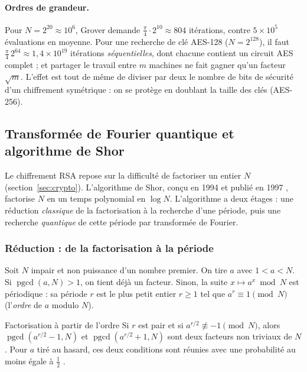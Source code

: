 \paragraph{Ordres de grandeur.} Pour $N=2^{20}\approx10^6$, Grover demande
$\frac\pi4\cdot2^{10}\approx804$ itérations, contre $5\times10^5$ évaluations en moyenne. Pour une
recherche de clé AES-128 ($N=2^{128}$), il faut $\frac\pi4\,2^{64}\approx1{,}4\times10^{19}$
itérations \emph{séquentielles}, dont chacune contient un circuit AES complet ; et partager le travail
entre $m$ machines ne fait gagner qu'un facteur $\sqrt m$. L'effet est tout de même de diviser par deux le
nombre de bits de sécurité d'un chiffrement symétrique : on se protège en doublant la taille des
clés (AES-256).

\subsection{Transformée de Fourier quantique et algorithme de Shor}\label{sec:shor}

Le chiffrement RSA repose sur la difficulté de factoriser un entier $N$ (section~\ref{sec:crypto}).
L'algorithme de Shor, conçu en 1994 et publié en 1997 \parencite{shor1997}, factorise $N$ en un temps polynomial en $\log N$.
L'algorithme a deux étages : une réduction \emph{classique} de la factorisation à la recherche d'une
période, puis une recherche \emph{quantique} de cette période par transformée de Fourier.

\subsubsection{Réduction : de la factorisation à la période}

Soit $N$ impair et non puissance d'un nombre premier. On tire $a$ avec $1<a<N$. Si
$\operatorname{pgcd}(a,N)>1$, on tient déjà un facteur. Sinon, la suite $x\mapsto a^x\bmod N$ est
périodique : sa période $r$ est le plus petit entier $r\geq1$ tel que $a^r\equiv1\pmod N$ (l'\emph{ordre}
de $a$ modulo $N$).

\begin{resultat}{Factorisation à partir de l'ordre}
Si $r$ est pair et si $a^{r/2}\not\equiv-1\pmod N$, alors $\operatorname{pgcd}(a^{r/2}-1,N)$ et
$\operatorname{pgcd}(a^{r/2}+1,N)$ sont deux facteurs non triviaux de $N$. Pour $a$ tiré au hasard,
ces deux conditions sont réunies avec une probabilité au moins égale à $\frac12$ \parencite[chap.~5]{nielsen2010}.
\end{resultat}

